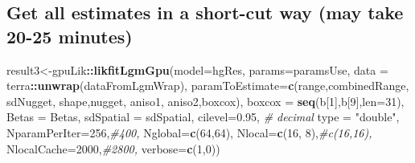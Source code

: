 \documentclass[
]{article}
\newenvironment{Shaded}{\begin{snugshade}}{\end{snugshade}}
\newcommand{\AttributeTok}[1]{\textcolor[rgb]{0.13,0.29,0.53}{#1}}
\newcommand{\CommentTok}[1]{\textcolor[rgb]{0.56,0.35,0.01}{\textit{#1}}}
\newcommand{\DecValTok}[1]{\textcolor[rgb]{0.00,0.00,0.81}{#1}}
\newcommand{\FloatTok}[1]{\textcolor[rgb]{0.00,0.00,0.81}{#1}}
\newcommand{\FunctionTok}[1]{\textcolor[rgb]{0.13,0.29,0.53}{\textbf{#1}}}
\newcommand{\NormalTok}[1]{#1}
\newcommand{\OtherTok}[1]{\textcolor[rgb]{0.56,0.35,0.01}{#1}}
\newcommand{\SpecialCharTok}[1]{\textcolor[rgb]{0.81,0.36,0.00}{\textbf{#1}}}
\newcommand{\StringTok}[1]{\textcolor[rgb]{0.31,0.60,0.02}{#1}}
\begin{document}
\hypertarget{get-all-estimates-in-a-short-cut-way-may-take-20-25-minutes}{%
\subsection{Get all estimates in a short-cut way (may take 20-25
minutes)}\label{get-all-estimates-in-a-short-cut-way-may-take-20-25-minutes}}

\begin{Shaded}
\begin{Highlighting}[]
\NormalTok{result3}\OtherTok{\textless{}{-}}\NormalTok{gpuLik}\SpecialCharTok{::}\FunctionTok{likfitLgmGpu}\NormalTok{(}\AttributeTok{model=}\NormalTok{hgRes,}
                              \AttributeTok{params=}\NormalTok{paramsUse, }
                              \AttributeTok{data =}\NormalTok{ terra}\SpecialCharTok{::}\FunctionTok{unwrap}\NormalTok{(dataFromLgmWrap),}
                              \AttributeTok{paramToEstimate=}\FunctionTok{c}\NormalTok{(}\StringTok{\textquotesingle{}range\textquotesingle{}}\NormalTok{,}\StringTok{\textquotesingle{}combinedRange\textquotesingle{}}\NormalTok{,}
                                                \StringTok{\textquotesingle{}sdNugget\textquotesingle{}}\NormalTok{,}
                                                \StringTok{\textquotesingle{}shape\textquotesingle{}}\NormalTok{,}\StringTok{\textquotesingle{}nugget\textquotesingle{}}\NormalTok{, }\StringTok{\textquotesingle{}aniso1\textquotesingle{}}\NormalTok{, }
                                                \StringTok{\textquotesingle{}aniso2\textquotesingle{}}\NormalTok{,}\StringTok{\textquotesingle{}boxcox\textquotesingle{}}\NormalTok{),}
                              \AttributeTok{boxcox =} \FunctionTok{seq}\NormalTok{(b[}\DecValTok{1}\NormalTok{],b[}\DecValTok{9}\NormalTok{],}\AttributeTok{len=}\DecValTok{31}\NormalTok{),}
                              \AttributeTok{Betas =}\NormalTok{ Betas,}
                              \AttributeTok{sdSpatial =}\NormalTok{ sdSpatial,}
                              \AttributeTok{cilevel=}\FloatTok{0.95}\NormalTok{,  }\CommentTok{\# decimal}
                              \AttributeTok{type =} \StringTok{"double"}\NormalTok{,}
                              \AttributeTok{NparamPerIter=}\DecValTok{256}\NormalTok{,}\CommentTok{\#400,}
                              \AttributeTok{Nglobal=}\FunctionTok{c}\NormalTok{(}\DecValTok{64}\NormalTok{,}\DecValTok{64}\NormalTok{),    }
                              \AttributeTok{Nlocal=}\FunctionTok{c}\NormalTok{(}\DecValTok{16}\NormalTok{, }\DecValTok{8}\NormalTok{),}\CommentTok{\#c(16,16),}
                              \AttributeTok{NlocalCache=}\DecValTok{2000}\NormalTok{,}\CommentTok{\#2800,}
                              \AttributeTok{verbose=}\FunctionTok{c}\NormalTok{(}\DecValTok{1}\NormalTok{,}\DecValTok{0}\NormalTok{))}
\end{Highlighting}
\end{Shaded}
\end{document}
